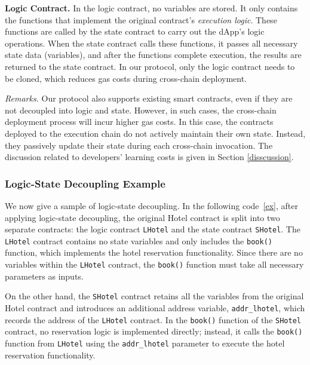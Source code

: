 \vspace{3pt}
\noindent
\textbf{Logic Contract.}
In the logic contract, no variables are stored. 
It only contains the functions that implement the original contract's \emph{execution logic}. 
These functions are called by the state contract to carry out the dApp's logic operations. 
When the state contract calls these functions, it passes all necessary state data (variables), and after the functions complete execution, the results are returned to the state contract. 
In our protocol, only the logic contract needs to be cloned, which reduces gas costs during cross-chain deployment.

\vspace{3pt}
\noindent
\emph{Remarks.}
Our protocol also supports existing smart contracts, even if they are not decoupled into logic and state. 
However, in such cases, the cross-chain deployment process will incur higher gas costs. 
In this case, the contracts deployed to the execution chain do not actively maintain their own state. 
Instead, they passively update their state during each cross-chain invocation. 
The discussion related to developers' learning costs is given in Section \ref{disscussion}.



\vspace{3pt}
\subsubsection{Logic-State Decoupling Example}
\label{codeex}

We now give a sample of logic-state decoupling. In the following code~\ref{ex}, after applying logic-state decoupling, the original Hotel contract is split into two separate contracts: the logic contract \texttt{LHotel} and the state contract \texttt{SHotel}. The \texttt{LHotel} contract contains no state variables and only includes the \texttt{book()} function, which implements the hotel reservation functionality. Since there are no variables within the \texttt{LHotel} contract, the \texttt{book()} function must take all necessary parameters as inputs.

On the other hand, the \texttt{SHotel} contract retains all the variables from the original Hotel contract and introduces an additional address variable, \texttt{addr\_lhotel}, which records the address of the \texttt{LHotel} contract. In the \texttt{book()} function of the \texttt{SHotel} contract, no reservation logic is implemented directly; instead, it calls the \texttt{book()} function from \texttt{LHotel} using the \texttt{addr\_lhotel} parameter to execute the hotel reservation functionality.


